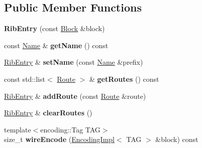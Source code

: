 \subsection*{Public Member Functions}
\begin{DoxyCompactItemize}
\item 
{\bfseries Rib\+Entry} (const \hyperlink{classndn_1_1Block}{Block} \&block)\hypertarget{classndn_1_1nfd_1_1RibEntry_aa2748c8fa3f59b588706ceca478202e4}{}\label{classndn_1_1nfd_1_1RibEntry_aa2748c8fa3f59b588706ceca478202e4}

\item 
const \hyperlink{classndn_1_1Name}{Name} \& {\bfseries get\+Name} () const\hypertarget{classndn_1_1nfd_1_1RibEntry_a7f3588cac48f8e312d7a4e9e2a24ccff}{}\label{classndn_1_1nfd_1_1RibEntry_a7f3588cac48f8e312d7a4e9e2a24ccff}

\item 
\hyperlink{classndn_1_1nfd_1_1RibEntry}{Rib\+Entry} \& {\bfseries set\+Name} (const \hyperlink{classndn_1_1Name}{Name} \&prefix)\hypertarget{classndn_1_1nfd_1_1RibEntry_a2e1a23b5a39b14789417a4355e34032f}{}\label{classndn_1_1nfd_1_1RibEntry_a2e1a23b5a39b14789417a4355e34032f}

\item 
const std\+::list$<$ \hyperlink{classndn_1_1nfd_1_1Route}{Route} $>$ \& {\bfseries get\+Routes} () const\hypertarget{classndn_1_1nfd_1_1RibEntry_a92169b7111df587434ca9e2a25c6df90}{}\label{classndn_1_1nfd_1_1RibEntry_a92169b7111df587434ca9e2a25c6df90}

\item 
\hyperlink{classndn_1_1nfd_1_1RibEntry}{Rib\+Entry} \& {\bfseries add\+Route} (const \hyperlink{classndn_1_1nfd_1_1Route}{Route} \&route)\hypertarget{classndn_1_1nfd_1_1RibEntry_acbb04576bffe2188a139a172f1095b11}{}\label{classndn_1_1nfd_1_1RibEntry_acbb04576bffe2188a139a172f1095b11}

\item 
\hyperlink{classndn_1_1nfd_1_1RibEntry}{Rib\+Entry} \& {\bfseries clear\+Routes} ()\hypertarget{classndn_1_1nfd_1_1RibEntry_accb954087e8a09797c0d2290f5eb0cab}{}\label{classndn_1_1nfd_1_1RibEntry_accb954087e8a09797c0d2290f5eb0cab}

\item 
{\footnotesize template$<$encoding\+::\+Tag T\+AG$>$ }\\size\+\_\+t {\bfseries wire\+Encode} (\hyperlink{classndn_1_1encoding_1_1EncodingImpl}{Encoding\+Impl}$<$ T\+AG $>$ \&block) const\hypertarget{classndn_1_1nfd_1_1RibEntry_ad6829fecae9fb96b571c689116bc4b78}{}\label{classndn_1_1nfd_1_1RibEntry_ad6829fecae9fb96b571c689116bc4b78}


\end{DoxyCompactItemize}
